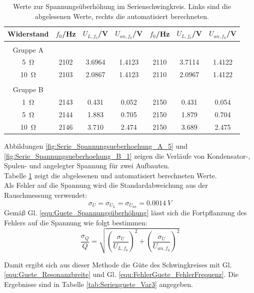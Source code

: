 \documentclass[12pt,a4paper]{article}
\begin{document}
\begin{table}
	\centering
	\begin{tabular}{|c|c|c|c||c|c|c|}
		\hline
		Widerstand & $f_0$/Hz & $U_{L, f_0}$/V & $U_{an, f_0}$/V & $f_0$/Hz & $U_{L, f_0}$/V & $U_{an, f_0}$/V \\
		\hline
		&&&&&&\\
		Gruppe A &&&&&&\\
		\hline
		\SI{5}{\ohm} & 2102 & 3.6964 & 1.4123 & 2110 & 3.7114 & 1.4122 \\
		\hline
		\SI{10}{\ohm} & 2103 & 2.0867 & 1.4123 & 2110 & 2.0967 & 1.4122 \\
		\hline
		&&&&&&\\
		Gruppe B &&&&&&\\
		\hline
		\SI{1}{\ohm} & 2143 & 0.431 & 0.052 & 2150 & 0.431 & 0.054 \\
		\hline
		\SI{5}{\ohm} & 2144 & 1.883 & 0.705 & 2150 & 1.879 & 0.704 \\
		\hline
		\SI{10}{\ohm} & 2146 & 3.710 & 2.474 & 2150 & 3.689 & 2.475 \\
		\hline
	\end{tabular}
	\caption{Werte zur Spannungsüberhöhung im Serienschwingkreis. Links sind die abgelesenen Werte, rechts die automatisiert berechneten.}
	\label{tab:Spannungsueberhoehung}
\end{table}

Abbildungen \ref{fig:Serie_Spannungsueberhoehung_A_5} und \ref{fig:Serie_Spannungsueberhoehung_B_1} zeigen die Verläufe von Kondensator-, Spulen- und angelegter Spannung für zwei Aufbauten.\\ 
Tabelle \ref{tab:Spannungsueberhoehung} zeigt die abgelesenen und automatisiert berechneten Werte.\\
Als Fehler auf die Spannung wird die Standardabweichung aus der Rauschmessung verwendet:
\begin{equation*}
\sigma _U = \sigma _{U_L} = \sigma _{U_{an}} = \SI{0.0014}{V}
\end{equation*}
Gemäß Gl. \ref{equ:Guete_Spannungsüberhöhung} lässt sich die Fortpflanzung des Fehlers auf die Spannung wie folgt bestimmen:
\begin{equation}
\dfrac{\sigma _Q}{Q} = \sqrt{\left( \dfrac{\sigma _U}{U_{L, f_0}} \right)^2 + \left( \dfrac{\sigma _U}{U_{an, f_0}} \right)^2}
\end{equation}

Damit ergibt sich aus dieser Methode die Güte des Schwingkreises mit Gl. \ref{equ:Guete_Resonanzbreite} und Gl. \ref{equ:FehlerGuete_FehlerFrequenz}. Die Ergebnisse sind in Tabelle \ref{tab:Serienguete_Var3} angegeben.
\end{document}
